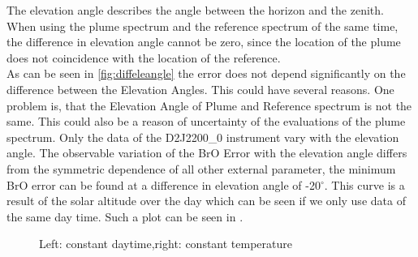 \documentclass  [
  paper    = a4,
  BCOR     = 10mm,
  twoside,
  fontsize = 12pt,
  fleqn,
  toc      = bibnumbered,
  toc      = listofnumbered,
  numbers  = noendperiod,
  headings = normal,
  listof   = leveldown,
  version  = 3.03
]                                       {scrreprt}
\begin{document}
	The elevation angle describes the angle between the horizon and the zenith. When using the plume spectrum and the reference spectrum of the same time, the difference in elevation angle cannot be zero, since the location of the plume does not coincidence with the location of the reference.\\
	As can be seen in \cref{fig:diffeleangle} the  error does not depend significantly on the difference between the Elevation Angles. This could have several reasons. One problem is, that the Elevation Angle of Plume and Reference spectrum is not the same. This could also be a reason of uncertainty of the evaluations of the plume spectrum.
	Only the data of the D2J2200\_0 instrument vary with the elevation angle. The observable variation of the BrO Error with the elevation angle differs from the symmetric dependence of all other external parameter, the minimum BrO error can be found at a difference in elevation angle of -20$^{\circ}$. This curve is a result of the solar altitude over the day which can be seen if we only use data of the same day time. Such a plot can be seen in \cite{fig:d2j22000diffelevangleonetempnevad}.
	\begin{figure}
		\caption{Left: constant daytime,right: constant temperature}
		\label{fig:d2j22000diffelevangleonetempnevad}
	\end{figure}
	
\end{document}
